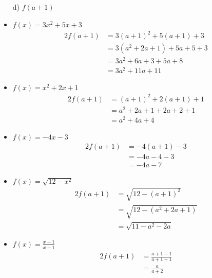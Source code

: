 \documentclass{templateNote}
\begin{document}
\begin{itemize}
    \item[d)] $f(a + 1)$
    \item $f(x) = 3x^2 + 5x + 3$
    \begin{alignat*}{2}
        f(a + 1) &= 3(a + 1)^2 + 5(a + 1) + 3 \\
        &= 3(a^2 + 2a + 1) + 5a + 5 + 3 \\
        &= 3a^2 + 6a + 3 + 5a + 8 \\
        &= 3a^2 + 11a + 11
    \end{alignat*}
    \item $f(x) = x^2 + 2x + 1$
    \begin{alignat*}{2}
        f(a + 1) &= (a + 1)^2 + 2(a + 1) + 1 \\
        &= a^2 + 2a + 1 + 2a + 2 + 1 \\
        &= a^2 + 4a + 4
    \end{alignat*}
    \item $f(x) = -4x - 3$
    \begin{alignat*}{2}
        f(a + 1) &= -4(a + 1) - 3 \\
        &= -4a - 4 - 3 \\
        &= -4a - 7
    \end{alignat*}
    \item $f(x) = \sqrt{12 - x^2}$
    \begin{alignat*}{2}
        f(a + 1) &= \sqrt{12 - (a + 1)^2} \\
        &= \sqrt{12 - (a^2 + 2a + 1)} \\
        &= \sqrt{11 - a^2 - 2a}
    \end{alignat*}
    \item $f(x) = \frac{x-1}{x+1}$
    \begin{alignat*}{2}
        f(a + 1) &= \frac{a + 1 - 1}{a + 1 + 1} \\
        &= \frac{a}{a + 2}
    \end{alignat*}
\end{itemize}
\end{document}
